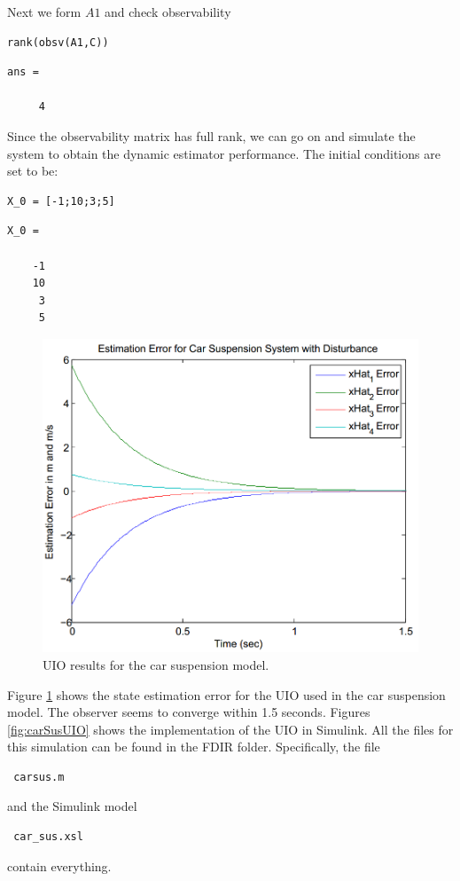 \documentclass{amsart}
\theoremstyle{definition}
\theoremstyle{remark}
\numberwithin{equation}{section}
\begin{document}
Next we form $A1$ and check observability

\begin{verbatim}
rank(obsv(A1,C))
\end{verbatim}

        \color{lightgray} \begin{verbatim}
ans =

     4

\end{verbatim} \color{black}

Since the observability matrix has full rank, we can go on and simulate the system to obtain the dynamic estimator performance. The initial conditions are set to be:

\begin{verbatim}
X_0 = [-1;10;3;5]
\end{verbatim}

        \color{lightgray} \begin{verbatim}
X_0 =

    -1
    10
     3
     5

\end{verbatim} \color{black}

\begin{figure}
    \centering
    \includegraphics[scale=.45]{carSusResults.png}
    \caption{UIO results for the car suspension model.}
    \label{fig:carSusResults}
\end{figure}

Figure \ref{fig:carSusResults} shows the state estimation error for the UIO used in the car suspension model. The observer seems to converge within 1.5 seconds.  Figures \ref{fig:carSusUIO} shows the implementation of the UIO in Simulink.  All the files for this simulation can be found in the \color{lightgray}FDIR \color{black} folder. Specifically, the file \begin{verbatim} carsus.m \end{verbatim} and the Simulink model \begin{verbatim} car_sus.xsl \end{verbatim} contain everything.
\end{document}
